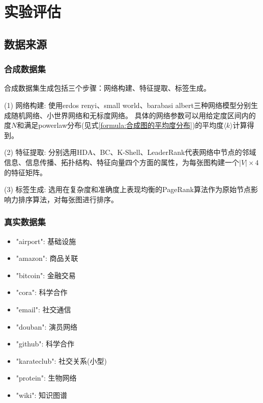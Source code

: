 \documentclass[twocolumn]{morningstar}
\begin{document}



\section{实验评估}\label{sec:ExperimentalEvaluation}
\subsection{数据来源}\label{sec:DataCollection}

\subsubsection{合成数据集}\label{sec:SyntheticDataset}

合成数据集生成包括三个步骤：网络构建、特征提取、标签生成。

(1) 网络构建: 使用erdos renyi、small world、barabasi albert三种网络模型分别生成随机网络、小世界网络和无标度网络。
具体的网络参数可以用给定度区间内的度$N$和满足powerlaw分布(见式\ref{formula:合成图的平均度分布})的平均度$\langle k \rangle$计算得到。



(2) 特征提取: 分别选用HDA\cite{cohen2001HDA}、BC、K-Shell、LeaderRank\cite{lu2011LeaderRank}代表网络中节点的邻域信息、信息传播、拓扑结构、特征向量四个方面的属性，为每张图构建一个$|V|\times4$的特征矩阵。

(3) 标签生成: 选用在复杂度和准确度上表现均衡的PageRank算法作为原始节点影响力排序算法，对每张图进行排序。


\subsubsection{真实数据集}\label{sec:RealDataset}

\begin{itemize}
    \item "airport": 基础设施
    \item "amazon": 商品关联
    \item "bitcoin": 金融交易
    \item "cora": 科学合作
    \item "email": 社交通信
    \item "douban": 演员网络
    \item "github": 科学合作
    \item "karateclub": 社交关系(小型)
    \item "protein": 生物网络
    \item "wiki": 知识图谱
\end{itemize}
\end{document}
